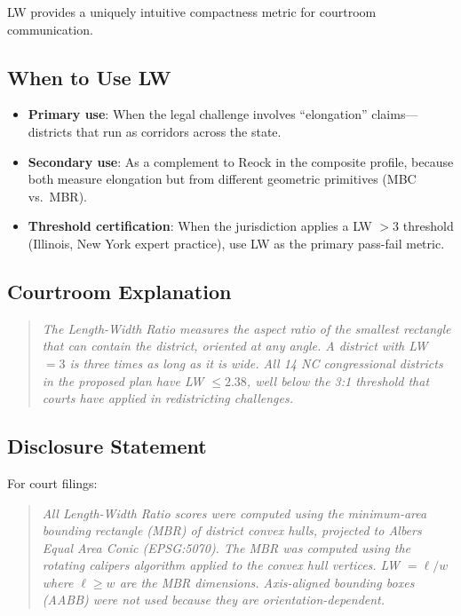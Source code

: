 LW provides a uniquely intuitive compactness metric for courtroom communication.

\subsection{When to Use LW}

\begin{itemize}
  \item \textbf{Primary use}: When the legal challenge involves ``elongation''
    claims---districts that run as corridors across the state.
  \item \textbf{Secondary use}: As a complement to Reock in the composite profile,
    because both measure elongation but from different geometric primitives
    (MBC vs.\ MBR).
  \item \textbf{Threshold certification}: When the jurisdiction applies a
    LW $> 3$ threshold (Illinois, New York expert practice), use LW as the
    primary pass-fail metric.
\end{itemize}

\subsection{Courtroom Explanation}

\begin{quote}
  \emph{The Length-Width Ratio measures the aspect ratio of the smallest rectangle
  that can contain the district, oriented at any angle. A district with LW $= 3$
  is three times as long as it is wide. All 14 NC congressional districts in
  the proposed plan have LW $\leq 2.38$, well below the 3:1 threshold that
  courts have applied in redistricting challenges.}
\end{quote}

\subsection{Disclosure Statement}

For court filings:
\begin{quote}
  \emph{All Length-Width Ratio scores were computed using the minimum-area
  bounding rectangle (MBR) of district convex hulls, projected to Albers
  Equal Area Conic (EPSG:5070). The MBR was computed using the rotating
  calipers algorithm applied to the convex hull vertices. LW $= \ell / w$
  where $\ell \geq w$ are the MBR dimensions. Axis-aligned bounding boxes
  (AABB) were not used because they are orientation-dependent.}
\end{quote}

